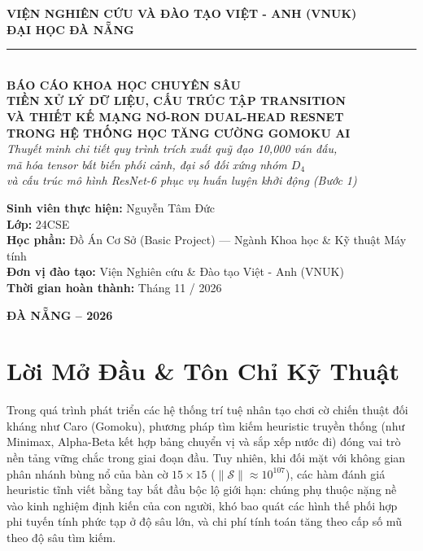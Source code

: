 \documentclass[11pt,a4paper]{report}
\begin{document}
\begin{titlepage}
\begin{center}
    {\large \textbf{VIỆN NGHIÊN CỨU VÀ ĐÀO TẠO VIỆT - ANH (VNUK)}}\\[4pt]
    {\large \textbf{ĐẠI HỌC ĐÀ NẴNG}}\\[8pt]
    \rule{0.6\textwidth}{1.2pt}\\[2.2cm]

    {\large \textbf{BÁO CÁO KHOA HỌC CHUYÊN SÂU}}\\[10pt]
    {\LARGE \bfseries \color{primary} TIỀN XỬ LÝ DỮ LIỆU, CẤU TRÚC TẬP TRANSITION\\VÀ THIẾT KẾ MẠNG NƠ-RON DUAL-HEAD RESNET\\TRONG HỆ THỐNG HỌC TĂNG CƯỜNG GOMOKU AI}\\[14pt]
    {\large \textit{Thuyết minh chi tiết quy trình trích xuất quỹ đạo 10,000 ván đấu,\\mã hóa tensor bất biến phối cảnh, đại số đối xứng nhóm $D_4$\\và cấu trúc mô hình ResNet-6 phục vụ huấn luyện khởi động (Bước 1)}}\\[2.2cm]

    \begin{minipage}{0.85\textwidth}
        \large
        \textbf{Sinh viên thực hiện:} Nguyễn Tâm Đức\\
        \textbf{Lớp:} 24CSE\\
        \textbf{Học phần:} Đồ Án Cơ Sở (Basic Project) --- Ngành Khoa học \& Kỹ thuật Máy tính\\
        \textbf{Đơn vị đào tạo:} Viện Nghiên cứu \& Đào tạo Việt - Anh (VNUK)\\
        \textbf{Thời gian hoàn thành:} Tháng 11 / 2026
    \end{minipage}

    \vfill
    {\large \textbf{ĐÀ NẴNG -- 2026}}
\end{center}
\end{titlepage}

\chapter*{Lời Mở Đầu \& Tôn Chỉ Kỹ Thuật}

Trong quá trình phát triển các hệ thống trí tuệ nhân tạo chơi cờ chiến thuật đối kháng như Caro (Gomoku), phương pháp tìm kiếm heuristic truyền thống (như Minimax, Alpha-Beta kết hợp bảng chuyển vị và sắp xếp nước đi) đóng vai trò nền tảng vững chắc trong giai đoạn đầu. Tuy nhiên, khi đối mặt với không gian phân nhánh bùng nổ của bàn cờ $15 \times 15$ ($\|\mathcal{S}\| \approx 10^{107}$), các hàm đánh giá heuristic tĩnh viết bằng tay bắt đầu bộc lộ giới hạn: chúng phụ thuộc nặng nề vào kinh nghiệm định kiến của con người, khó bao quát các hình thế phối hợp phi tuyến tính phức tạp ở độ sâu lớn, và chi phí tính toán tăng theo cấp số mũ theo độ sâu tìm kiếm.
\end{document}
